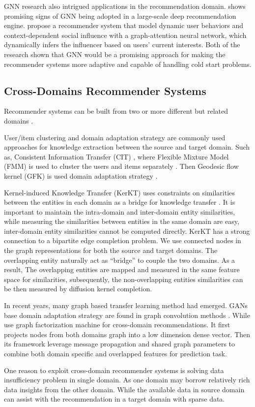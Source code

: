 GNN research also intrigued applications in the recommendation domain. \citet{ying2018graph} shows promising signs of GNN being adopted in a large-scale deep recommendation engine. \citet{song2019session} propose a recommender system that model dynamic user behaviors and context-dependent social influence with a graph-attention neural network, which dynamically infers the influencer based on users’ current interests. Both of the research shown that GNN would be a promising approach for making the recommender systems more adaptive and capable of handling cold start problems.

\subsection{Cross-Domains Recommender Systems}
Recommender systems can be built from two or more different but related domains \citep{fernandez2012cross}.

User/item clustering and domain adaptation strategy are commonly used approaches for knowledge extraction between the source and target domain. Such as, Consistent Information Transfer (CIT) \citep{zhang2017cross}, where Flexible Mixture Model (FMM) is used to cluster the users and items separately \citep{si2003flexible}. Then Geodesic flow kernel (GFK) is used domain adaptation strategy \citep{gong2014learning}.

Kernel-induced Knowledge Transfer (KerKT) uses constraints on similarities between the entities in each domain as a bridge for knowledge transfer \citep{zhang2018cross}. It is important to maintain the intra-domain and inter-domain entity similarities, while measuring the similarities between entities in the same domain are easy, inter-domain entity similarities cannot be computed directly.
KerKT has a strong connection to a bipartite edge completion problem\citep{he2016birank}. We use connected nodes in the graph representations for both the source and target domains. The overlapping entity naturally act as “bridge” to couple the two domains.
As a result, The overlapping entities are mapped and measured in the same feature space for similarities, subsequently, the non-overlapping entities similarities can be then measured by diffusion kernel completion.

In recent years, many graph based transfer learning method had emerged. GANs \citep{goodfellow2014generative} base domain adaptation strategy are found in graph convolution methods \citep{dai2019network}. While \citet{xi2020graph} use graph factorization machine for cross-domain recommendations. It first projects nodes from both domains graph into a low dimension dense vector. Then its framework leverage message propagation and shared graph parameters to combine both domain specific and overlapped features for prediction task.

One reason to exploit cross-domain recommender systems is solving data insufficiency problem in single domain. As one domain may borrow relatively rich data insights from the other domain. While the available data in source domain can assist with the recommendation in a target domain with sparse data. 


